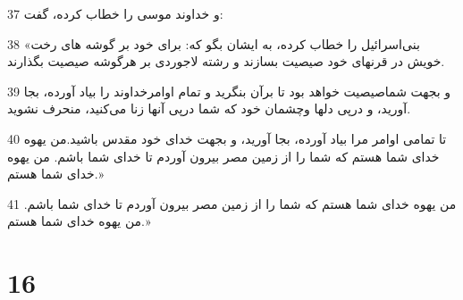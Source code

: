 \par 37 و خداوند موسی را خطاب کرده، گفت:
\par 38 «بنی‌اسرائیل را خطاب کرده، به ایشان بگو که: برای خود بر گوشه های رخت خویش در قرنهای خود صیصیت بسازند و رشته لاجوردی بر هرگوشه صیصیت بگذارند.
\par 39 و بجهت شماصیصیت خواهد بود تا برآن بنگرید و تمام اوامرخداوند را بیاد آورده، بجا آورید، و در‌پی دلها وچشمان خود که شما در‌پی آنها زنا می‌کنید، منحرف نشوید.
\par 40 تا تمامی اوامر مرا بیاد آورده، بجا آورید، و بجهت خدای خود مقدس باشید.من یهوه خدای شما هستم که شما را از زمین مصر بیرون آوردم تا خدای شما باشم. من یهوه خدای شما هستم.»
\par 41 من یهوه خدای شما هستم که شما را از زمین مصر بیرون آوردم تا خدای شما باشم. من یهوه خدای شما هستم.»
 
\chapter{16}

